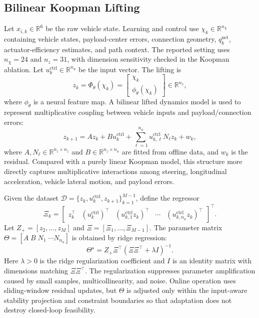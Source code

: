 \documentclass[letterpaper,journal]{IEEEtran}
\newcommand{\R}{\mathbb{R}}
\begin{document}
\subsection{Bilinear Koopman Lifting}

Let $x_{i,k}\in\R^6$ be the raw vehicle state. Learning and control use $\chi_k\in\R^{n_\chi}$ containing vehicle states, payload-center errors, connection geometry, $q_k^{\mathrm{net}}$, actuator-efficiency estimates, and path context. The reported setting uses $n_\chi=24$ and $n_z=31$, with dimension sensitivity checked in the Koopman ablation. Let $u_k^{\mathrm{ctrl}}\in\R^{n_u}$ be the input vector. The lifting is
\begin{equation}
z_k=\Phi_\theta(\chi_k)=\begin{bmatrix}\chi_k\\ \phi_\theta(\chi_k)\end{bmatrix}\in\R^{n_z},
\label{eq:koopman_lift}
\end{equation}
where $\phi_\theta$ is a neural feature map. A bilinear lifted dynamics model is used to represent multiplicative coupling between vehicle inputs and payload/connection errors:
\begin{equation}
z_{k+1}=A z_k+B u_k^{\mathrm{ctrl}}+\sum_{\ell=1}^{n_u} u_{k,\ell}^{\mathrm{ctrl}} N_\ell z_k+w_k,
\label{eq:bilinear_koopman}
\end{equation}
where $A,N_\ell\in\R^{n_z\times n_z}$ and $B\in\R^{n_z\times n_u}$ are fitted from offline data, and $w_k$ is the residual. Compared with a purely linear Koopman model, this structure more directly captures multiplicative interactions among steering, longitudinal acceleration, vehicle lateral motion, and payload errors.

Given the dataset $\mathcal D=\{z_k,u_k^{\mathrm{ctrl}},z_{k+1}\}_{k=1}^{M-1}$, define the regressor
\begin{equation}
\Xi_k=\begin{bmatrix}z_k^\top&(u_k^{\mathrm{ctrl}})^\top&(u_{k,1}^{\mathrm{ctrl}}z_k)^\top&\cdots&(u_{k,n_u}^{\mathrm{ctrl}}z_k)^\top\end{bmatrix}^\top .
\label{eq:bilinear_regressor}
\end{equation}
Let $Z_+=[z_2,\ldots,z_M]$ and $\Xi=[\Xi_1,\ldots,\Xi_{M-1}]$. The parameter matrix $\Theta=[A\;B\;N_1\;\cdots N_{n_u}]$ is obtained by ridge regression:
\begin{equation}
\Theta^\star=Z_+\Xi^\top(\Xi\Xi^\top+\lambda I)^{-1}.
\label{eq:ridge_fit}
\end{equation}
Here $\lambda>0$ is the ridge regularization coefficient and $I$ is an identity matrix with dimensions matching $\Xi\Xi^\top$. The regularization suppresses parameter amplification caused by small samples, multicollinearity, and noise. Online operation uses sliding-window residual updates, but $\Theta$ is adjusted only within the input-aware stability projection and constraint boundaries so that adaptation does not destroy closed-loop feasibility.
\end{document}
